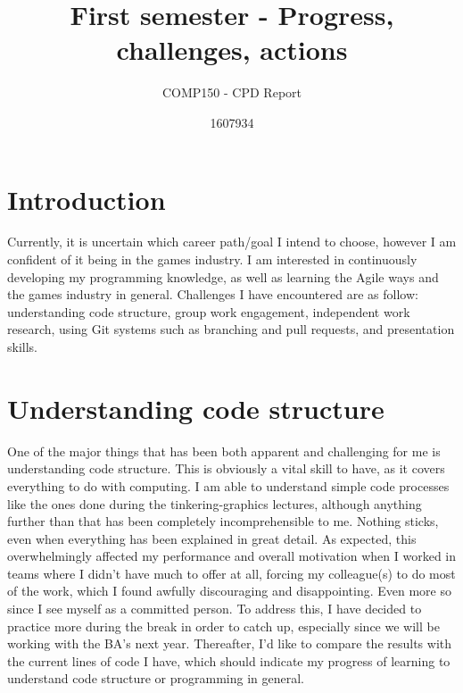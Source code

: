 \documentclass{scrartcl}
\title{First semester - Progress, challenges, actions}
\subtitle{COMP150 - CPD Report}
\author{1607934}
\begin{document}
\maketitle

\section{Introduction}

Currently, it is uncertain which career path/goal I intend to choose, however I am confident of it being in the games industry. I am interested in continuously developing my programming knowledge, as well as learning the Agile ways and the games industry in general. Challenges I have encountered are as follow: understanding code structure, group work engagement, independent work research, using Git systems such as branching and pull requests, and presentation skills. 

\section{Understanding code structure}
One of the major things that has been both apparent and challenging for me is understanding code structure. This is obviously a vital skill to have, as it covers everything to do with computing. I am able to understand simple code processes like the ones done during the tinkering-graphics lectures, although anything further than that has been completely incomprehensible to me. Nothing sticks, even when everything has been explained in great detail. As expected, this overwhelmingly affected my performance and overall motivation when I worked in teams where I didn't have much to offer at all, forcing my colleague(s) to do most of the work, which I found awfully discouraging and disappointing. Even more so since I see myself as a committed person. To address this, I have decided to practice more during the break in order to catch up, especially since we will be working with the BA's next year. Thereafter, I'd like to compare the results with the current lines of code I have, which should indicate my progress of learning to understand code structure or programming in general.  
\end{document}

